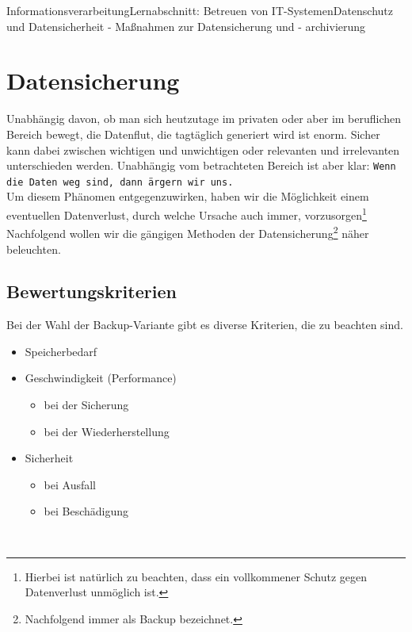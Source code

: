 \documentclass[11pt,oneside,openany,headings=optiontotoc,11pt,numbers=noenddot]{article}
\begin{document}
	\begin{worksheet}{Informationsverarbeitung}{Lernabschnitt: Betreuen von IT-Systemen}{Datenschutz und Datensicherheit - Maßnahmen zur Datensicherung und - archivierung}
		\section{Datensicherung}
		Unabhängig davon, ob man sich heutzutage im privaten oder aber im beruflichen Bereich bewegt, die Datenflut, die tagtäglich generiert wird ist enorm. Sicher kann dabei zwischen wichtigen und unwichtigen oder relevanten und irrelevanten unterschieden werden. Unabhängig vom betrachteten Bereich ist aber klar: \texttt{Wenn die Daten weg sind, dann ärgern wir uns.}\\
		Um diesem Phänomen entgegenzuwirken, haben wir die Möglichkeit einem eventuellen Datenverlust, durch welche Ursache auch immer, vorzusorgen\footnote{Hierbei ist natürlich zu beachten, dass ein vollkommener Schutz gegen Datenverlust unmöglich ist.} Nachfolgend wollen wir die gängigen Methoden der Datensicherung\footnote{Nachfolgend immer als Backup bezeichnet.} näher beleuchten.
		\subsection*{Bewertungskriterien}
		Bei der Wahl der Backup-Variante gibt es diverse Kriterien, die zu beachten sind.\\
		\par\noindent
		\begin{minipage}{0.48\textwidth}
			\begin{itemize}
				\itemsep0em
				\item Speicherbedarf
				\item Geschwindigkeit (Performance)
				\begin{itemize}
					\itemsep0em
					\item bei der Sicherung
					\item bei der Wiederherstellung
				\end{itemize}
			\end{itemize}
		\end{minipage}
		\hfill
		\begin{minipage}{0.48\textwidth}
			\begin{itemize}
				\item Sicherheit
				\begin{itemize}
					\item bei Ausfall
					\item bei Beschädigung
				\end{itemize}
			\end{itemize}
		\end{minipage}\\

\end{worksheet}
\end{document}
